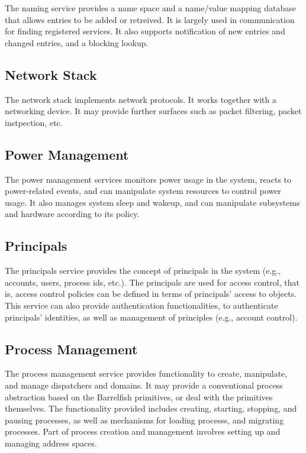 \documentclass[a4paper,twoside]{report} %
\begin{document}

The naming service provides a name space and a name/value mapping
database that allows entries to be added or retreived.  It is largely
used in communication for finding registered services.  It also
supports notification of new entries and changed entries, and a
blocking lookup.

\subsection{Network Stack}


The network stack implements network protocols. It works
together with a networking device. It may provide further surfaces
such as packet filtering, packet instpection, etc.

\subsection{Power Management}


The power management services monitors power usage in the system,
reacts to power-related events, and can manipulate system resources to
control power usage.  It also manages system sleep and wakeup, and
can manipulate subsystems and hardware according to its policy.

\subsection{Principals}


The principals service provides the concept of principals in the
system (e.g., accounts, users, process ids, etc.).  The principals are used for
access control, that is, access control policies can be defined in
terms of principals' access to objects.  This service can also provide
authentication functionalities, to authenticate principals'
identities, as well as management of principles (e.g., account control).

\subsection{Process Management}


The process management service provides functionality to create,
manipulate, and manage dispatchers and domains. It may provide a
conventional process abstraction based on the Barrelfish primitives,
or deal with the primitives themselves.  The functionality provided
includes creating, starting, stopping, and pausing processes, as well
as mechanisms for loading processs, and migrating processes.  Part of
process creation and management involves setting up and managing
address spaces.
\end{document}
